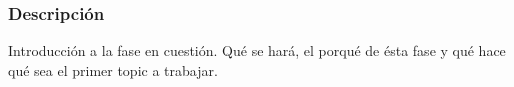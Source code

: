 \subsubsection{Descripción}
Introducción a la fase en cuestión. Qué se hará, el porqué de ésta fase y qué hace qué sea el primer topic a trabajar.